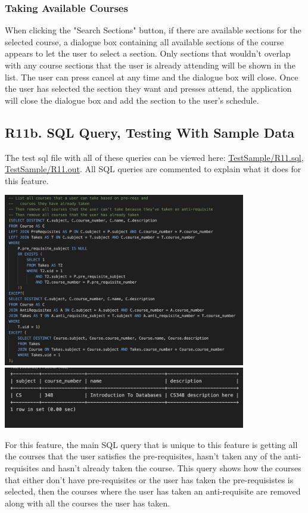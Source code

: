 \documentclass[12pt, a4paper]{article}
\begin{document}
\subsubsection*{Taking Available Courses}
When clicking the "Search Sections" button, if there are available sections for the selected course, a dialogue box containing all available sections of the course appears to let the user to select a section. Only sections that wouldn't overlap with any course sections that the user is already attending will be shown in the list. The user can press cancel at any time and the dialogue box will close. Once the user has selected the section they want and presses attend, the application will close the dialogue box and add the section to the user's schedule.
\subsection*{R11b. SQL Query, Testing With Sample Data}
The test sql file with all of these queries can be viewed here: \underline{\href{https://github.com/Kggupta/DegreeMap/tree/main/Database/Queries/TestSample}{TestSample/R11.sql}}, \underline{\href{https://github.com/Kggupta/DegreeMap/tree/main/Database/Queries/TestSample}{TestSample/R11.out}}. All SQL queries are commented to explain what it does for this feature.
\begin{center}
    \includegraphics[width=400px]{R11/q1}
    \includegraphics[width=400px]{R11/q1out}
\end{center}
For this feature, the main SQL query that is unique to this feature is getting all the courses that the user satisfies the pre-requisites, hasn't taken any of the anti-requisites and hasn't already taken the course. This query shows how the courses that either don't have pre-requisites or the user has taken the pre-requisistes is selected, then the courses where the user has taken an anti-requisite are removed along with all the courses the user has taken.
\end{document}
